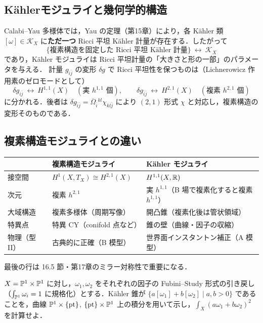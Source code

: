 \subsection{K\"ahlerモジュライと幾何学的構造}

Calabi--Yau 多様体では，Yau の定理（第15章）により，各 K\"ahler 類 $[\omega]\in\mathcal{K}_X$ に\textbf{ただ一つ} Ricci 平坦 K\"ahler 計量が存在する．したがって
\[
\{\text{複素構造を固定した Ricci 平坦 K\"ahler 計量}\}\ \longleftrightarrow\ \mathcal{K}_X
\]
であり，K\"ahler モジュライは Ricci 平坦計量の「大きさと形の一部」のパラメータを与える．
計量 $g_{i\bar j}$ の変形 $\delta g$ で Ricci 平坦性を保つものは（Lichnerowicz 作用素のゼロモードとして）
\[
\delta g_{i\bar j}\ \leftrightarrow\ H^{1,1}(X)\quad(\text{実 } h^{1,1} \text{ 個}),\qquad
\delta g_{\bar i\bar j}\ \leftrightarrow\ H^{2,1}(X)\quad(\text{複素 } h^{2,1} \text{ 個})
\]
に分かれる．後者は $\delta g_{\bar i\bar j}=\overline{\Omega}_{\bar i}{}^{kl}\chi_{kl\bar j}$ により $(2,1)$ 形式 $\chi$ と対応し，複素構造の変形そのものである．

\subsection{複素構造モジュライとの違い}

\begin{center}
\small
\begin{tabular}{lll}
\hline
 & 複素構造モジュライ & K\"ahler モジュライ\\
\hline
接空間 & $H^1(X,T_X)\cong H^{2,1}(X)$ & $H^{1,1}(X,\mathbb{R})$\\
次元 & 複素 $h^{2,1}$ & 実 $h^{1,1}$（B 場で複素化すると複素 $h^{1,1}$）\\
大域構造 & 複素多様体（周期写像） & 開凸錐（複素化後は管状領域）\\
特異点 & 特異 CY（conifold 点など） & 錐の壁（曲線・因子の収縮）\\
物理（型 II） & 古典的に正確（B 模型） & 世界面インスタントン補正（A 模型）\\
\hline
\end{tabular}
\end{center}
最後の行は 16.5 節・第17章のミラー対称性で重要になる．

$X=\mathbb{P}^1\times\mathbb{P}^1$ に対し，$\omega_1,\omega_2$ をそれぞれの因子の Fubini--Study 形式の引き戻し（$\int_{\mathbb{P}^1}\omega_i=1$ に規格化）とする．K\"ahler 錐が $\{a[\omega_1]+b[\omega_2]\mid a,b>0\}$ であることを，曲線 $\mathbb{P}^1\times\{\mathrm{pt}\}$, $\{\mathrm{pt}\}\times\mathbb{P}^1$ 上の積分を用いて示し，$\int_X(a\omega_1+b\omega_2)^2$ を計算せよ．

